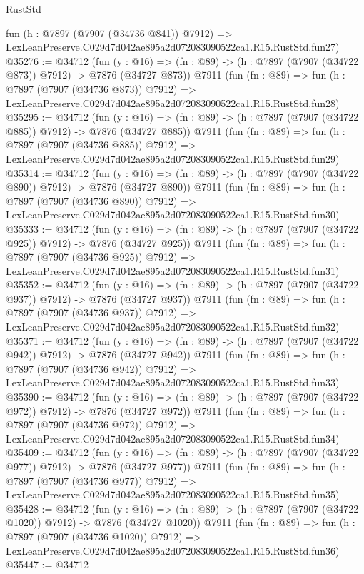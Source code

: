 \begin{lexlean}{RustStd}
\begin{coremodule}
    fun (h : @7897 (@7907 (@34736 @841)) @7912) =>
    LexLeanPreserve.C029d7d042ae895a2d072083090522ca1.R15.RustStd.fun27)
@35276 := @34712
    (fun (y : @16) => (fn : @89) -> (h : @7897 (@7907 (@34722 @873)) @7912) -> @7876 (@34727 @873))
    @7911
    (fun (fn : @89) =>
    fun (h : @7897 (@7907 (@34736 @873)) @7912) =>
    LexLeanPreserve.C029d7d042ae895a2d072083090522ca1.R15.RustStd.fun28)
@35295 := @34712
    (fun (y : @16) => (fn : @89) -> (h : @7897 (@7907 (@34722 @885)) @7912) -> @7876 (@34727 @885))
    @7911
    (fun (fn : @89) =>
    fun (h : @7897 (@7907 (@34736 @885)) @7912) =>
    LexLeanPreserve.C029d7d042ae895a2d072083090522ca1.R15.RustStd.fun29)
@35314 := @34712
    (fun (y : @16) => (fn : @89) -> (h : @7897 (@7907 (@34722 @890)) @7912) -> @7876 (@34727 @890))
    @7911
    (fun (fn : @89) =>
    fun (h : @7897 (@7907 (@34736 @890)) @7912) =>
    LexLeanPreserve.C029d7d042ae895a2d072083090522ca1.R15.RustStd.fun30)
@35333 := @34712
    (fun (y : @16) => (fn : @89) -> (h : @7897 (@7907 (@34722 @925)) @7912) -> @7876 (@34727 @925))
    @7911
    (fun (fn : @89) =>
    fun (h : @7897 (@7907 (@34736 @925)) @7912) =>
    LexLeanPreserve.C029d7d042ae895a2d072083090522ca1.R15.RustStd.fun31)
@35352 := @34712
    (fun (y : @16) => (fn : @89) -> (h : @7897 (@7907 (@34722 @937)) @7912) -> @7876 (@34727 @937))
    @7911
    (fun (fn : @89) =>
    fun (h : @7897 (@7907 (@34736 @937)) @7912) =>
    LexLeanPreserve.C029d7d042ae895a2d072083090522ca1.R15.RustStd.fun32)
@35371 := @34712
    (fun (y : @16) => (fn : @89) -> (h : @7897 (@7907 (@34722 @942)) @7912) -> @7876 (@34727 @942))
    @7911
    (fun (fn : @89) =>
    fun (h : @7897 (@7907 (@34736 @942)) @7912) =>
    LexLeanPreserve.C029d7d042ae895a2d072083090522ca1.R15.RustStd.fun33)
@35390 := @34712
    (fun (y : @16) => (fn : @89) -> (h : @7897 (@7907 (@34722 @972)) @7912) -> @7876 (@34727 @972))
    @7911
    (fun (fn : @89) =>
    fun (h : @7897 (@7907 (@34736 @972)) @7912) =>
    LexLeanPreserve.C029d7d042ae895a2d072083090522ca1.R15.RustStd.fun34)
@35409 := @34712
    (fun (y : @16) => (fn : @89) -> (h : @7897 (@7907 (@34722 @977)) @7912) -> @7876 (@34727 @977))
    @7911
    (fun (fn : @89) =>
    fun (h : @7897 (@7907 (@34736 @977)) @7912) =>
    LexLeanPreserve.C029d7d042ae895a2d072083090522ca1.R15.RustStd.fun35)
@35428 := @34712
    (fun (y : @16) =>
    (fn : @89) -> (h : @7897 (@7907 (@34722 @1020)) @7912) -> @7876 (@34727 @1020))
    @7911
    (fun (fn : @89) =>
    fun (h : @7897 (@7907 (@34736 @1020)) @7912) =>
    LexLeanPreserve.C029d7d042ae895a2d072083090522ca1.R15.RustStd.fun36)
@35447 := @34712

\end{coremodule}
\end{lexlean}
